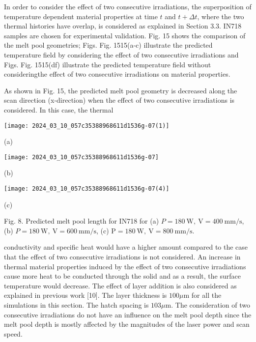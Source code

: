 \documentclass[10pt]{article}
\begin{document}
In order to consider the effect of two consecutive irradiations, the superposition of temperature dependent material properties at time $t$ and $t+\Delta t$, where the two thermal histories have overlap, is considered as explained in Section 3.3. IN718 samples are chosen for experimental validation. Fig. 15 shows the comparison of the melt pool geometries; Figs. Fig. 1515(a-c) illustrate the predicted temperature field by considering the effect of two consecutive irradiations and Figs. Fig. 1515(df) illustrate the predicted temperature field without consideringthe effect of two consecutive irradiations on material properties.

As shown in Fig. 15, the predicted melt pool geometry is decreased along the scan direction (x-direction) when the effect of two consecutive irradiations is considered. In this case, the thermal

\begin{center}
\texttt{[image: 2024\_03\_10\_057c35388968611d1536g-07(1)]}
\end{center}

(a)

\begin{center}
\texttt{[image: 2024\_03\_10\_057c35388968611d1536g-07]}
\end{center}

(b)

\begin{center}
\texttt{[image: 2024\_03\_10\_057c35388968611d1536g-07(4)]}
\end{center}

(c)

Fig. 8. Predicted melt pool length for IN718 for (a) $P=180 \mathrm{~W}, \mathrm{~V}=400 \mathrm{~mm} / \mathrm{s}$, (b) $P=180 \mathrm{~W}, \mathrm{~V}=600 \mathrm{~mm} / \mathrm{s}$, (c) $\mathrm{P}=180 \mathrm{~W}, \mathrm{~V}=800 \mathrm{~mm} / \mathrm{s}$.

conductivity and specific heat would have a higher amount compared to the case that the effect of two consecutive irradiations is not considered. An increase in thermal material properties induced by the effect of two consecutive irradiations cause more heat to be conducted through the solid and as a result, the surface temperature would decrease. The effect of layer addition is also considered as explained in previous work [10]. The layer thickness is $100 \mu \mathrm{m}$ for all the simulations in this section. The hatch spacing is $103 \mu \mathrm{m}$. The consideration of two consecutive irradiations do not have an influence on the melt pool depth since the melt pool depth is mostly affected by the magnitudes of the laser power and scan speed.
\end{document}
